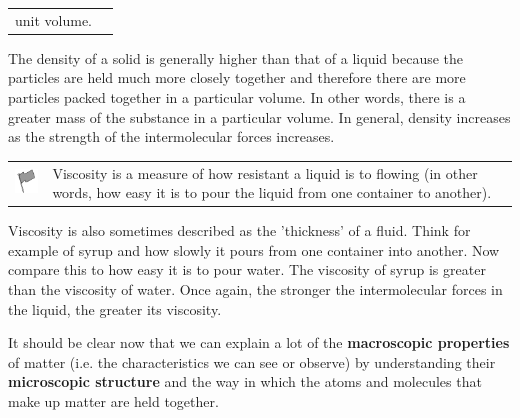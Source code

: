 \begin{enumerate}[noitemsep, label=\textbf{\arabic*}. ]
\begin{definition}
\begin{tabular*}{15 cm}{m{15 mm}m{}}
{unit volume. } 
      \end{tabular*}
      \end{definition}
 The density of a solid is generally higher than that of a liquid 
because the particles are held much more closely together and therefore there 
are more particles packed together in a particular volume. In other words, there 
is a greater mass of the substance in a particular volume. In general, density 
increases as the strength of the intermolecular forces increases. \vspace{\rubberspace}\par
        \label{m38734*fhsstid84}\begin{definition}
	  \begin{tabular*}{15 cm}{m{15 mm}m{}}
	\hspace*{-50pt}  \includegraphics[width=0.5in]{col11305.imgs/psflag2.png}   & \Definition{   \label{id2412552}\textbf{Viscosity}} { \label{m38734*meaningfhsstid84}Viscosity is a measure of how resistant a liquid is to 
flowing (in other words, how easy it is to pour the liquid from one container to 
another). } 
      \end{tabular*}
      \end{definition}
 Viscosity is also sometimes described as the 'thickness' of a fluid. 
Think for example of syrup and how slowly it pours from one container into 
another. Now compare this to how easy it is to pour water. The viscosity of 
syrup is greater than the viscosity of water. Once again, the stronger the 
intermolecular forces in the liquid, the greater its viscosity.
\end{enumerate}
\label{m38734*eip-473}It should be clear now that we can explain a lot of 
the \textbf{macroscopic properties} of matter (i.e. 
the characteristics we can see or observe) by understanding their \textbf{microscopic structure} and the way in which the atoms 
and molecules that make up matter are held together.\par \label{m38734*secfhsst!!!underscore!!!id289}
